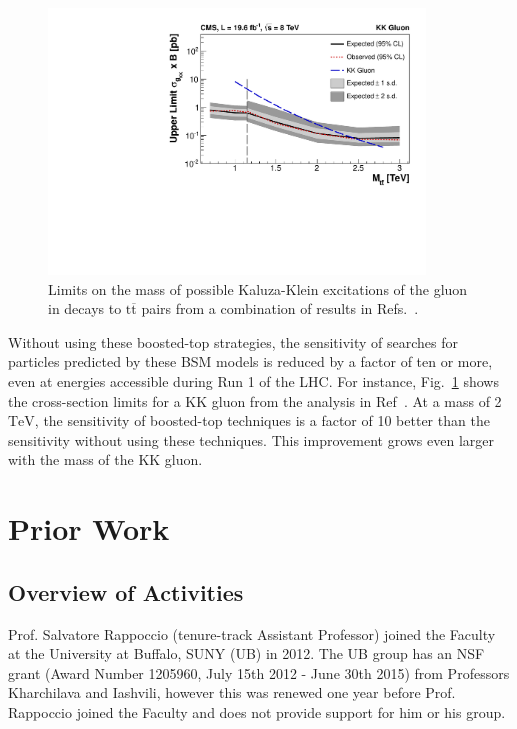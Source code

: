 \documentclass[12pt]{proposalnsf}
\newcommand{\TeVcc}{\ensuremath{\mathrm{TeV}}}
\newcommand{\ttbar}        {\ensuremath{\mathrm{t}\overline{\mathrm{t}}}}
\begin{document}
\begin{figure}[h!]
    \centering
    \includegraphics[width=100mm]{limits-kk_combined}
    \caption{\label{fig:limits-kk_combined}Limits on the mass of
      possible Kaluza-Klein excitations of the gluon in decays to
      $\ttbar$ pairs from a combination of results in
      Refs.~\cite{B2G-12-005,B2G-12-006}. }
\end{figure}


Without using these
boosted-top strategies, the
sensitivity of searches for particles predicted by these BSM models is
reduced by a factor of ten or more, even at energies accessible during
Run 1 of the LHC. For instance, Fig.~\ref{fig:limits-kk_combined}
shows the cross-section limits for a KK gluon from the analysis in
Ref~\cite{B2G-13-001}. At a mass of 2 \TeVcc, the sensitivity of
boosted-top techniques is a factor of 10 better than the sensitivity
without using these techniques. This improvement grows even larger
with the mass of the KK gluon. 



\section{Prior Work}
\label{sec:priorwork}


\subsection{Overview of Activities}
\label{sec:overview}

Prof. Salvatore Rappoccio (tenure-track Assistant Professor) joined
the Faculty at the University at Buffalo, SUNY (UB) in 2012. The UB
group has an NSF grant (Award Number 1205960, July 15th 2012 - June
30th 2015) from Professors Kharchilava and Iashvili, however this was
renewed one year before Prof. Rappoccio joined the Faculty and does
not provide support for him or his group. 
\end{document}
